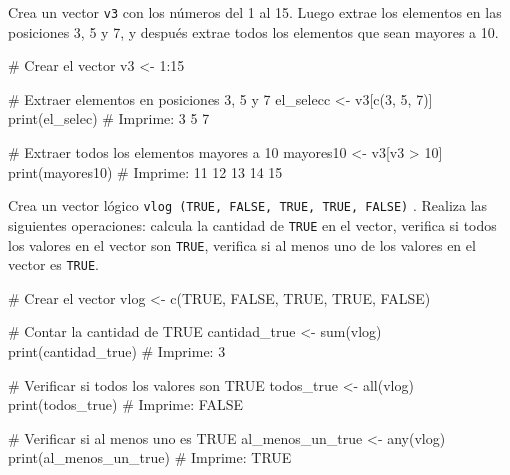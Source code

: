 \documentclass[
  letterpaper,
  DIV=11,
  numbers=noendperiod]{scrreprt}
\newenvironment{Shaded}{\begin{snugshade}}{\end{snugshade}}
\newcommand{\CommentTok}[1]{\textcolor[rgb]{0.37,0.37,0.37}{#1}}
\newcommand{\ConstantTok}[1]{\textcolor[rgb]{0.56,0.35,0.01}{#1}}
\newcommand{\DecValTok}[1]{\textcolor[rgb]{0.68,0.00,0.00}{#1}}
\newcommand{\FunctionTok}[1]{\textcolor[rgb]{0.28,0.35,0.67}{#1}}
\newcommand{\NormalTok}[1]{\textcolor[rgb]{0.00,0.23,0.31}{#1}}
\newcommand{\OtherTok}[1]{\textcolor[rgb]{0.00,0.23,0.31}{#1}}
\newcommand{\SpecialCharTok}[1]{\textcolor[rgb]{0.37,0.37,0.37}{#1}}
\begin{document}
Crea un vector \texttt{v3} con los números del 1 al 15. Luego extrae los
elementos en las posiciones 3, 5 y 7, y después extrae todos los
elementos que sean mayores a 10.

\begin{Shaded}
\begin{Highlighting}[]
\CommentTok{\# Crear el vector}
\NormalTok{v3 }\OtherTok{\textless{}{-}} \DecValTok{1}\SpecialCharTok{:}\DecValTok{15}

\CommentTok{\# Extraer elementos en posiciones 3, 5 y 7}
\NormalTok{el\_selecc }\OtherTok{\textless{}{-}}\NormalTok{ v3[}\FunctionTok{c}\NormalTok{(}\DecValTok{3}\NormalTok{, }\DecValTok{5}\NormalTok{, }\DecValTok{7}\NormalTok{)]}
\FunctionTok{print}\NormalTok{(el\_selec)  }\CommentTok{\# Imprime: 3 5 7}

\CommentTok{\# Extraer todos los elementos mayores a 10}
\NormalTok{mayores10 }\OtherTok{\textless{}{-}}\NormalTok{ v3[v3 }\SpecialCharTok{\textgreater{}} \DecValTok{10}\NormalTok{]}
\FunctionTok{print}\NormalTok{(mayores10)  }\CommentTok{\# Imprime: 11 12 13 14 15}
\end{Highlighting}
\end{Shaded}

Crea un vector lógico
\texttt{vlog\ (TRUE,\ FALSE,\ TRUE,\ TRUE,\ FALSE)} . Realiza las
siguientes operaciones: calcula la cantidad de \texttt{TRUE} en el
vector, verifica si todos los valores en el vector son \texttt{TRUE},
verifica si al menos uno de los valores en el vector es \texttt{TRUE}.

\begin{Shaded}
\begin{Highlighting}[]
\CommentTok{\# Crear el vector}
\NormalTok{vlog }\OtherTok{\textless{}{-}} \FunctionTok{c}\NormalTok{(}\ConstantTok{TRUE}\NormalTok{, }\ConstantTok{FALSE}\NormalTok{, }\ConstantTok{TRUE}\NormalTok{, }\ConstantTok{TRUE}\NormalTok{, }\ConstantTok{FALSE}\NormalTok{)}

\CommentTok{\# Contar la cantidad de TRUE}
\NormalTok{cantidad\_true }\OtherTok{\textless{}{-}} \FunctionTok{sum}\NormalTok{(vlog)}
\FunctionTok{print}\NormalTok{(cantidad\_true)  }\CommentTok{\# Imprime: 3}

\CommentTok{\# Verificar si todos los valores son TRUE}
\NormalTok{todos\_true }\OtherTok{\textless{}{-}} \FunctionTok{all}\NormalTok{(vlog)}
\FunctionTok{print}\NormalTok{(todos\_true)  }\CommentTok{\# Imprime: FALSE}

\CommentTok{\# Verificar si al menos uno es TRUE}
\NormalTok{al\_menos\_un\_true }\OtherTok{\textless{}{-}} \FunctionTok{any}\NormalTok{(vlog)}
\FunctionTok{print}\NormalTok{(al\_menos\_un\_true)  }\CommentTok{\# Imprime: TRUE}
\end{Highlighting}
\end{Shaded}
\end{document}
